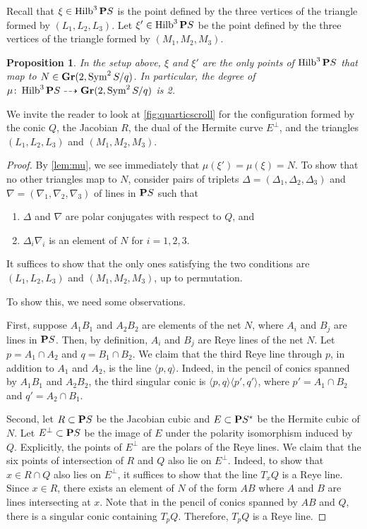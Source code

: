 \documentclass[11pt,reqno]{amsart}
\theoremstyle{plain}
\newtheorem{proposition}[theorem]{Proposition}
\theoremstyle{definition}
\theoremstyle{remark}
\numberwithin{equation}{section}
\DeclareMathOperator{\Hilb}{Hilb}
\numberwithin{equation}{section}
\begin{document}
Recall that $\xi \in \Hilb^3\P S$ is the point defined by the three vertices of the triangle formed by $(L_1, L_2, L_3)$.
Let $\xi' \in \Hilb^3\P S$ be the point defined by the three vertices of the triangle formed by $(M_1, M_2, M_3)$.
\begin{proposition}\label{prop:quarticscroll}
  In the setup above, $\xi$ and $\xi'$ are the only points of $\Hilb^3\P S$ that map to $N \in \Gr(2, \Sym^2S/q)$.
  In particular, the degree of $\mu \from \Hilb^3\P S \dashrightarrow \Gr(2, \Sym^2S/q)$ is 2.
\end{proposition}
We invite the reader to look at \autoref{fig:quarticscroll} for the configuration formed by the conic $Q$, the Jacobian $R$, the dual of the Hermite curve $E^\perp$, and the triangles $(L_1,L_2,L_3)$ and $(M_1,M_2,M_3)$.
\begin{proof}
  By \autoref{lem:mu}, we see immediately that $\mu(\xi') = \mu(\xi) = N$.
  To show that no other triangles map to $N$, consider pairs of triplets $\Delta = (\Delta_1, \Delta_2, \Delta_3)$ and $\nabla = (\nabla_1, \nabla_2, \nabla_3)$ of lines in $\P S$ such that
  \begin{enumerate}
  \item $\Delta$ and $\nabla$ are polar conjugates with respect to $Q$, and
  \item $\Delta_i\nabla_i$ is an element of $N$ for $i = 1, 2, 3$.
  \end{enumerate}
  It suffices to show that the only ones satisfying the two conditions are $(L_1, L_2, L_3)$ and $(M_1, M_2, M_3)$, up to permutation.
  
  To show this, we need some observations.

  First, suppose $A_1B_1$ and $A_2B_2$ are elements of the net $N$, where $A_i$ and $B_j$ are lines in $\P S$.
  Then, by definition, $A_i$ and $B_j$ are Reye lines of the net $N$.
  Let $p = A_1 \cap A_2$ and $q = B_1 \cap B_2$.
  We claim that the third Reye line through $p$, in addition to $A_1$ and $A_2$, is the line $\langle p, q\rangle$.
  Indeed, in the pencil of conics spanned by $A_1B_1$ and $A_2B_2$, the third singular conic is $\langle p, q\rangle \langle p', q'\rangle$, where $p' = A_1 \cap B_2$ and $q' = A_2 \cap B_1$.

  Second, let $R \subset \P S$ be the Jacobian cubic and $E \subset \P S^*$ be the Hermite cubic of $N$.
  Let $E^\perp \subset \P S$ be the image of $E$ under the polarity isomorphism induced by $Q$.
  Explicitly, the points of $E^\perp$ are the polars of the Reye lines.
  We claim that the six points of intersection of $R$ and $Q$ also lie on $E^\perp$.
  Indeed, to show that $x \in R \cap Q$ also lies on $E^\perp$, it suffices to show that the line $T_xQ$ is a Reye line.
  Since $x \in R$, there exists an element of $N$ of the form $AB$ where $A$ and $B$ are lines intersecting at $x$.
  Note that in the pencil of conics spanned by $AB$ and $Q$, there is a singular conic containing $T_pQ$.
  Therefore, $T_pQ$ is a Reye line.
  

\end{proof}
\end{document}
